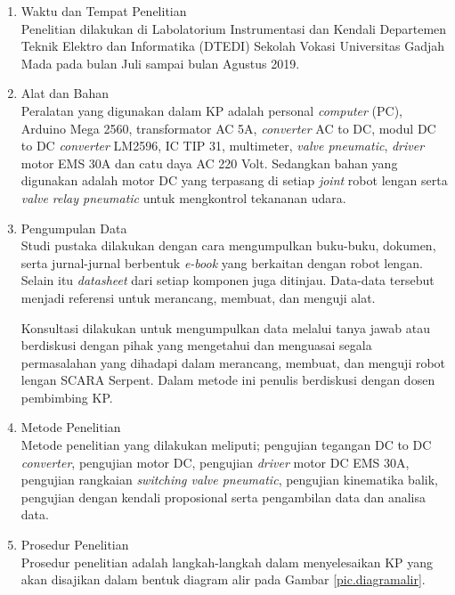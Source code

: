 \begin{enumerate}
	\item Waktu dan Tempat Penelitian \\
	Penelitian dilakukan di Labolatorium Instrumentasi dan Kendali Departemen Teknik Elektro dan Informatika (DTEDI) Sekolah Vokasi Universitas Gadjah Mada pada bulan Juli sampai bulan Agustus 2019.
	
	\item Alat dan Bahan \\
	Peralatan yang digunakan dalam KP adalah personal \textit{computer} (PC), Arduino Mega 2560, transformator AC 5A, \textit{converter} AC to DC, modul DC to DC \textit{converter} LM2596, IC TIP 31, multimeter,\textit{ valve pneumatic}, \textit{driver} motor EMS 30A dan catu daya AC 220 Volt. Sedangkan bahan yang digunakan adalah motor DC yang terpasang di setiap \emph {joint} robot lengan serta \textit{valve relay pneumatic} untuk mengkontrol tekananan udara.
	
	\item  Pengumpulan Data \\
	Studi pustaka dilakukan dengan cara mengumpulkan buku-buku, dokumen, serta jurnal-jurnal berbentuk \emph{e-book} yang berkaitan dengan robot lengan. Selain itu \emph{datasheet} dari setiap komponen juga ditinjau. Data-data tersebut menjadi referensi untuk merancang, membuat, dan menguji alat. 
	
	Konsultasi dilakukan untuk mengumpulkan data melalui tanya jawab atau berdiskusi dengan pihak yang mengetahui dan menguasai segala permasalahan yang dihadapi dalam merancang, membuat, dan menguji robot lengan SCARA Serpent. Dalam metode ini penulis berdiskusi dengan dosen pembimbing KP. 
	
	\item Metode Penelitian \\
	Metode penelitian yang dilakukan meliputi; pengujian tegangan DC to DC \textit{converter}, pengujian motor DC, pengujian \textit{driver} motor DC EMS 30A, pengujian rangkaian \textit{switching valve pneumatic}, pengujian kinematika balik, pengujian dengan kendali proposional serta pengambilan data dan analisa data.
	
	\item Prosedur Penelitian\\
	Prosedur penelitian adalah langkah-langkah dalam menyelesaikan KP yang akan disajikan dalam bentuk diagram alir pada Gambar \ref{pic.diagramalir}.
	

\end{enumerate}
